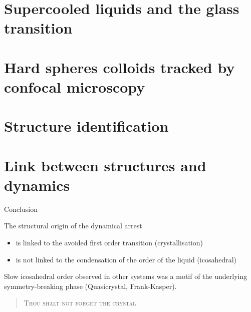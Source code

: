 \documentclass{beamer}
\begin{document}
\begin{frame}[plain]
\end{frame}



%

\section{Supercooled liquids and the glass transition}


\section{Hard spheres colloids tracked by confocal microscopy}


\section[Structure]{Structure identification}


\section[Link with dynamics]{Link between structures and dynamics}


\begin{frame}{Conclusion}
	\begin{block}{The structural origin of the dynamical arrest}
	\begin{itemize}
		\item is linked to the avoided first order transition (crystallisation)
		\item is not linked to the condensation of the order of the liquid (icosahedral)
	\end{itemize}
	\end{block}
	Slow icosahedral order observed in other systems was a motif of the underlying symmetry-breaking phase (Quasicrystal, Frank-Kasper).
	
	\bigskip
	
	\begin{verse}
	\textsc{Thou shalt not forget the crystal}
	\end{verse}

\end{frame}
\end{document}

